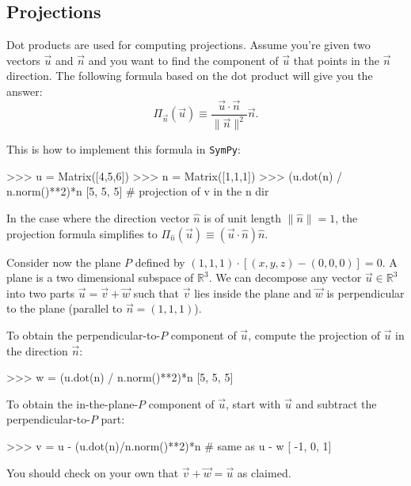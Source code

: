 
\vspace{-4mm}

	
\subsection{Projections}
\label{vectors:projections}

\vspace{-2mm}

Dot products are used for computing projections.
Assume you're given two vectors $\vec{u}$ and $\vec{n}$ and you want to find the component
of $\vec{u}$ that points in the $\vec{n}$ direction.
The following formula based on the dot product will give you the answer:
\[
 \Pi_{\vec{n}}( \vec{u} ) \equiv \frac{  \vec{u} \cdot \vec{n}  }{ \| \vec{n} \|^2 } \vec{n}.
\]

\vspace{-2mm}

\noindent
This is how to implement this formula in \texttt{SymPy}:
\small
\begin{verbatimtab}
>>> u = Matrix([4,5,6])
>>> n = Matrix([1,1,1])
>>> (u.dot(n) / n.norm()**2)*n
[5, 5, 5]                      # projection of v in the n dir
\end{verbatimtab}
\normalsize

\noindent
In the case where the direction vector $\hat{n}$ is of unit length $\|\hat{n}\| = 1$,
the projection formula simplifies to $\Pi_{\hat{n}}( \vec{u} ) \equiv (\vec{u}\cdot\hat{n})\hat{n}$.


Consider now the plane $P$ defined by $(1,1,1)\cdot[(x,y,z)-(0,0,0)]=0$.
A plane is a two dimensional subspace of $\mathbb{R}^3$.
We can decompose any vector $\vec{u} \in \mathbb{R}^3$ into two parts $\vec{u}=\vec{v} + \vec{w}$
such that $\vec{v}$ lies inside the plane and $\vec{w}$ is perpendicular to the plane (parallel to $\vec{n}=(1,1,1)$).

To obtain the perpendicular-to-$P$ component of $\vec{u}$,
compute the projection of $\vec{u}$ in the direction $\vec{n}$:
\small
\begin{verbatimtab}
>>> w = (u.dot(n) / n.norm()**2)*n
[5, 5, 5]
\end{verbatimtab}
\normalsize

\noindent
To obtain the in-the-plane-$P$ component of $\vec{u}$,
start with $\vec{u}$ and subtract the perpendicular-to-$P$ part:
\small
\begin{verbatimtab}
>>> v = u - (u.dot(n)/n.norm()**2)*n      # same as u - w
[ -1, 0, 1]
\end{verbatimtab}
\normalsize

\noindent
You should check on your own that $\vec{v}+\vec{w}=\vec{u}$ as claimed.

\vspace{-5mm}
